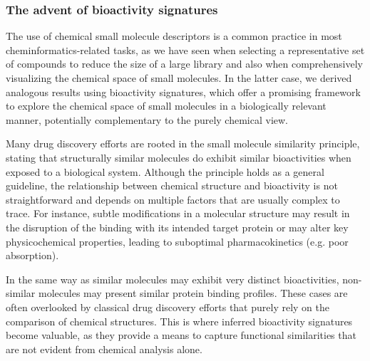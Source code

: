 \subsubsection{The advent of bioactivity signatures}

The use of chemical small molecule descriptors is a common practice in most cheminformatics-related tasks, as we have seen when selecting a representative set of compounds to reduce the size of a large library and also when comprehensively visualizing the chemical space of small molecules. In the latter case, we derived analogous results using bioactivity signatures, which offer a promising framework to explore the chemical space of small molecules in a biologically relevant manner, potentially complementary to the purely chemical view. 

Many drug discovery efforts are rooted in the small molecule similarity principle, stating that structurally similar molecules do exhibit similar bioactivities when exposed to a biological system. Although the principle holds as a general guideline, the relationship between chemical structure and bioactivity is not straightforward and depends on multiple factors that are usually complex to trace. For instance, subtle modifications in a molecular structure may result in the disruption of the binding with its intended target protein or may alter key physicochemical properties, leading to suboptimal pharmacokinetics (e.g. poor absorption).

In the same way as similar molecules may exhibit very distinct bioactivities, non-similar molecules may present similar protein binding profiles. These cases are often overlooked by classical drug discovery efforts that purely rely on the comparison of chemical structures. This is where inferred bioactivity signatures become valuable, as they provide a means to capture functional similarities that are not evident from chemical analysis alone.

